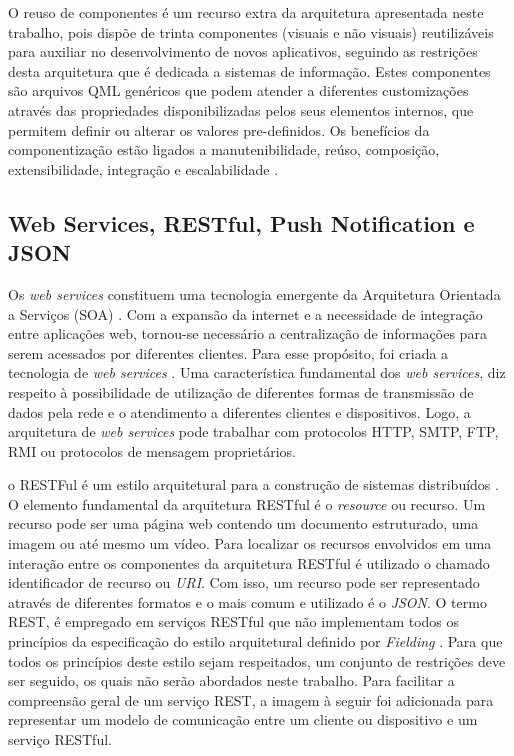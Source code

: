 O reuso de componentes é um recurso extra da arquitetura apresentada neste trabalho, pois dispõe de trinta componentes (visuais e não visuais) reutilizáveis para auxiliar no desenvolvimento de novos aplicativos, seguindo as restrições desta arquitetura que é dedicada a sistemas de informação. Estes componentes são arquivos QML genéricos que podem atender a diferentes customizações através das propriedades disponibilizadas pelos seus elementos internos, que permitem definir ou alterar os valores pre-definidos. Os benefícios da componentização estão ligados a manutenibilidade, reúso, composição, extensibilidade, integração e escalabilidade \cite{D'Souza:1998:OCF:291139}.\par


\subsection{Web Services, RESTful, Push Notification e JSON}
Os \textit{web services} constituem uma tecnologia emergente da Arquitetura Orientada a Serviços (SOA) \cite{perepletchikov}. Com a expansão da internet e a necessidade de integração entre aplicações web, tornou-se necessário a centralização de informações para serem acessados por diferentes clientes. Para esse propósito, foi criada a tecnologia de \textit{web services} \cite{ibm_research}. Uma característica fundamental dos \textit{web services}, diz respeito à possibilidade de utilização de diferentes formas de transmissão de dados pela rede e o atendimento a diferentes clientes e dispositivos. Logo, a arquitetura de \textit{web services} pode trabalhar com protocolos HTTP, SMTP, FTP, RMI ou protocolos de mensagem proprietários.\par

o RESTFul é um estilo arquitetural para a construção de sistemas distribuídos \cite{fielding}. O elemento fundamental da arquitetura RESTful é o \textit{resource} ou recurso. Um recurso pode ser uma página web contendo um documento estruturado, uma imagem ou até mesmo um vídeo. Para localizar os recursos envolvidos em uma interação entre os componentes da arquitetura RESTful é utilizado o chamado identificador de recurso ou \textit{URI}. Com isso, um recurso pode ser representado através de diferentes formatos e o mais comum e utilizado é o \textit{JSON}. O termo REST, é empregado em serviços RESTful que não implementam todos os princípios da especificação do estilo arquitetural definido por \textit{Fielding} \cite{fielding}. Para que todos os princípios deste estilo sejam respeitados, um conjunto de restrições deve ser seguido, os quais não serão abordados neste trabalho. Para facilitar a compreensão geral de um serviço REST, a imagem à seguir foi adicionada para representar um modelo de comunicação entre um cliente ou dispositivo e um serviço RESTful.

